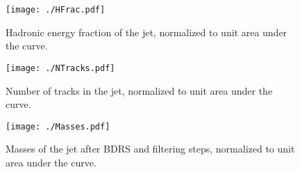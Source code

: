 \begin{figure}
    \begin{center}
        \texttt{[image: ./HFrac.pdf]}
        \caption{ Hadronic energy fraction of the jet, normalized to unit area under the curve. }
        \label{fig:HFrac}
    \end{center}
\end{figure}

\begin{figure}
    \begin{center}
        \texttt{[image: ./NTracks.pdf]}
        \caption{ Number of tracks in the jet, normalized to unit area under the curve. }
        \label{fig:NTracks}
    \end{center}
\end{figure}

\begin{figure}
    \begin{center}
        \texttt{[image: ./Masses.pdf]}
        \caption{ Masses of the jet after BDRS and filtering steps, normalized to unit area under the curve. }
        \label{fig:Masses}
    \end{center}
\end{figure}
